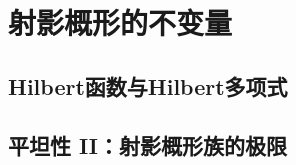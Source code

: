 \section{射影概形的不变量}\label{s:3.3}

\subsection{Hilbert函数与Hilbert多项式}\label{s:3.3.1}

\subsection{平坦性 II：射影概形族的极限}\label{s:3.3.2}